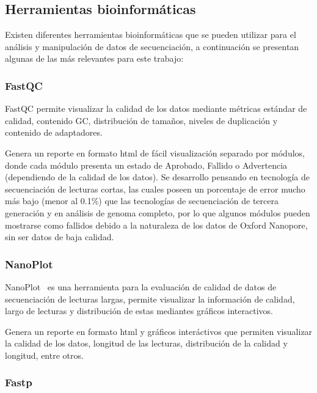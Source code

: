 \subsection{Herramientas bioinformáticas}
Existen diferentes herramientas bioinformáticas que se pueden utilizar para el análisis y manipulación de datos de secuenciación, a continuación se presentan algunas de las más relevantes para este trabajo:

\subsubsection{FastQC}
FastQC\cite{andrews2010fastqc} permite visualizar la calidad de los datos mediante métricas estándar de calidad, contenido GC, distribución de tamaños, niveles de duplicación  y contenido de adaptadores.


Genera un reporte en formato html de fácil visualización separado por módulos, donde cada módulo presenta un estado de Aprobado, Fallido o Advertencia (dependiendo de la calidad de los datos). Se desarrollo pensando en tecnología de secuenciación de lecturas cortas, las cuales poseen un porcentaje de error mucho más bajo (menor al 0.1\%) que las tecnologías de secuenciación de tercera generación y en análisis de genoma completo, por lo que algunos módulos pueden mostrarse como fallidos debido a la naturaleza de los datos de Oxford Nanopore, sin ser datos de baja calidad.
\subsubsection{NanoPlot}
NanoPlot~\cite{10.1093/bioinformatics/btad311} es una herramienta para la evaluación de calidad de datos de secuenciación de lecturas largas, permite visualizar la información de calidad, largo de lecturas y distribución de estas mediantes gráficos interactivos.

Genera un reporte en formato html y gráficos interáctivos que permiten visualizar la calidad de los datos, longitud de las lecturas, distribución de la calidad y longitud, entre otros.
\subsubsection{Fastp}

